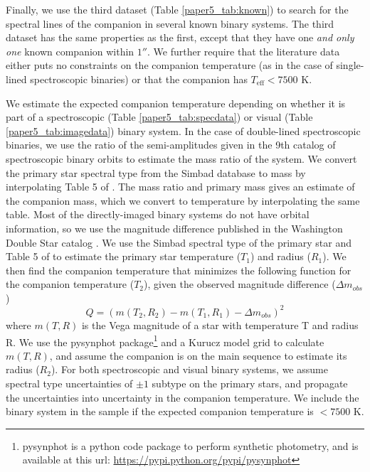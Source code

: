 Finally, we use the third dataset (Table \ref{paper5_tab:known}) to search for the spectral lines of the companion in several known binary systems. The third dataset has the same properties as the first, except that they have one \emph{and only one} known companion within $1 ''$. We further require that the literature data either puts no constraints on the companion temperature (as in the case of single-lined spectroscopic binaries) or that the companion has $T_\mathrm{eff} < 7500$ K. 

We estimate the expected companion temperature depending on whether it is part of a spectroscopic (Table \ref{paper5_tab:specdata}) or visual (Table \ref{paper5_tab:imagedata}) binary system. In the case of double-lined spectroscopic binaries, we use the ratio of the semi-amplitudes given in the 9th catalog of spectroscopic binary orbits \citep[SB9,][]{SB9} to estimate the mass ratio of the system. We convert the primary star spectral type from the Simbad database \citep{Simbad} to mass by interpolating Table 5 of \citet{Pecaut2013}. The mass ratio and primary mass gives an estimate of the companion mass, which we convert to temperature by interpolating the same table. Most of the directly-imaged binary systems do not have orbital information, so we use the magnitude difference published in the Washington Double Star catalog \citep[WDS, ][]{WDS}. We use the Simbad spectral type of the primary star and Table 5 of \citet{Pecaut2013} to estimate the primary star temperature ($T_1$) and radius ($R_1$). We then find the companion temperature that minimizes the following function for the companion temperature ($T_2$), given the observed magnitude difference ($\Delta m_{obs}$)
\begin{equation}
Q = (m(T_2, R_2) - m(T_1, R_1) - \Delta m_{obs})^2
\label{paper5_eqn:secteff}
\end{equation}
where $m(T, R)$ is the Vega magnitude of a star with temperature T and radius R. We use the pysynphot package\footnote{pysynphot is a python code package to perform synthetic photometry, and is available at this url: \url{https://pypi.python.org/pypi/pysynphot}} and a Kurucz model grid \citep{Castelli2003} to calculate $m(T, R)$, and assume the companion is on the main sequence to estimate its radius ($R_2$). For both spectroscopic and visual binary systems, we assume spectral type uncertainties of $\pm 1$ subtype on the primary stars, and propagate the uncertainties into uncertainty in the companion temperature. We include the binary system in the sample if the expected companion temperature is $< 7500$ K. 

